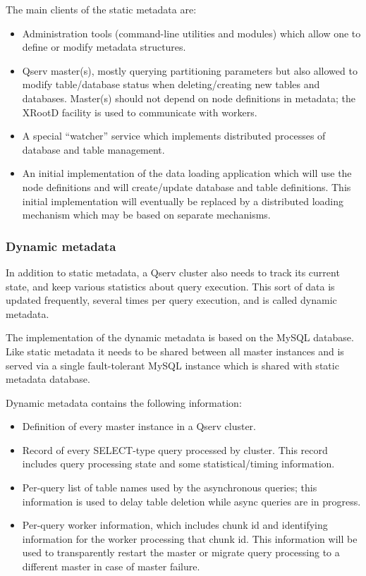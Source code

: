 \documentclass[DM,toc]{lsstdoc}
\begin{document}
The main clients of the static metadata are:

\begin{itemize}
\item
  Administration tools (command-line utilities and modules) which allow
  one to define or modify metadata structures.
\item
  Qserv master(s), mostly querying partitioning parameters but also
  allowed to modify table/database status when deleting/creating new
  tables and databases. Master(s) should not depend on node definitions
  in metadata; the XRootD facility is used to communicate with workers.
\item
  A special ``watcher'' service which implements distributed processes of
  database and table management.
\item
  An initial implementation of the data loading application which will
  use the node definitions and will create/update database and table
  definitions. This initial implementation will eventually be replaced
  by a distributed loading mechanism which may be based on separate
  mechanisms.
\end{itemize}

\subsubsection{Dynamic metadata}\label{dynamic-metadata}

In addition to static metadata, a Qserv cluster also needs to track its
current state, and keep various statistics about query execution. This
sort of data is updated frequently, several times per query execution,
and is called dynamic metadata.

The implementation of the dynamic metadata is based on the MySQL
database. Like static metadata it needs to be shared between all master
instances and is served via a single fault-tolerant MySQL instance
which is shared with static metadata database.

Dynamic metadata contains the following information:

\begin{itemize}
\item
  Definition of every master instance in a Qserv cluster.
\item
  Record of every SELECT-type query processed by cluster. This record
  includes query processing state and some statistical/timing
  information.
\item
  Per-query list of table names used by the asynchronous queries; this
  information is used to delay table deletion while async queries are in
  progress.
\item
  Per-query worker information, which includes chunk id and identifying
  information for the worker processing that chunk id. This information
  will be used to transparently restart the master or migrate query
  processing to a different master in case of master failure.
\end{itemize}
\end{document}
